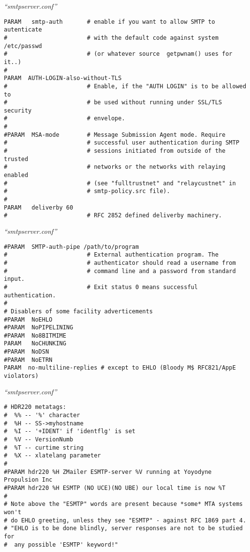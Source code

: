 \documentclass[a4paper,landscape]{slides}
\begin{document}
\begin{overlay}
\small
\centerline{{\em ``smtpserver.conf''}}
\tiny
\begin{verbatim}
PARAM   smtp-auth       # enable if you want to allow SMTP to autenticate
#                       # with the default code against system  /etc/passwd
#                       # (or whatever source  getpwnam() uses for it..)
#
PARAM  AUTH-LOGIN-also-without-TLS
#                       # Enable, if the "AUTH LOGIN" is to be allowed to
#                       # be used without running under SSL/TLS security
#                       # envelope.
#
#PARAM  MSA-mode        # Message Submission Agent mode. Require
#                       # successful user authentication during SMTP
#                       # sessions initiated from outside of the trusted
#                       # networks or the networks with relaying enabled
#                       # (see "fulltrustnet" and "relaycustnet" in
#                       # smtp-policy.src file).
#
PARAM   deliverby 60
#                       # RFC 2852 defined deliverby machinery.
\end{verbatim}
\vfill
\end{overlay}
\begin{overlay}
\small
\centerline{{\em ``smtpserver.conf''}}
\tiny
\begin{verbatim}
#PARAM  SMTP-auth-pipe /path/to/program
#                       # External authentication program. The
#                       # authenticator should read a username from
#                       # command line and a password from standard input.
#                       # Exit status 0 means successful authentication.
#
# Disablers of some facility adverticements
#PARAM  NoEHLO
#PARAM  NoPIPELINING
#PARAM  No8BITMIME
PARAM   NoCHUNKING
#PARAM  NoDSN
#PARAM  NoETRN
PARAM  no-multiline-replies # except to EHLO (Bloody M$ RFC821/AppE violators)
\end{verbatim}
\vfill
\end{overlay}
\begin{overlay}
\small
\centerline{{\em ``smtpserver.conf''}}
\tiny
\begin{verbatim}
# HDR220 metatags:
#  %% -- '%' character
#  %H -- SS->myhostname
#  %I -- '+IDENT' if 'identflg' is set
#  %V -- VersionNumb
#  %T -- curtime string
#  %X -- xlatelang parameter
#
#PARAM hdr220 %H ZMailer ESMTP-server %V running at Yoyodyne Propulsion Inc
#PARAM hdr220 %H ESMTP (NO UCE)(NO UBE) our local time is now %T
#
# Note above the "ESMTP" words are present because *some* MTA systems won't
# do EHLO greeting, unless they see "ESMTP" - against RFC 1869 part 4.
# "EHLO is to be done blindly, server responses are not to be studied for
#  any possible 'ESMTP' keyword!"
\end{verbatim}
\vfill
\end{overlay}
\end{document}
